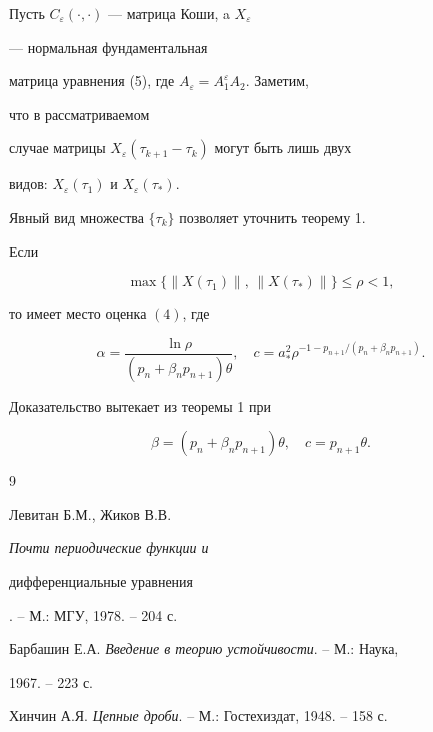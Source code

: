  


Пусть $C_\varepsilon(\cdot,\cdot)$ --- матрица Коши, a $X_\varepsilon$ 


--- нормальная фундаментальная 


матрица уравнения (5), где $A_\varepsilon=A^\varepsilon_1A_2$. Заметим, 


что в рассматриваемом 


случае матрицы $X_\varepsilon(\tau_{k+1}-\tau_k)$ могут быть лишь двух 


видов: $X_\varepsilon(\tau_1)$ и $X_\varepsilon(\tau_*)$. 


Явный вид множества $\{\tau_k\}$ позволяет уточнить теорему 1. 


 


\begin{thm} 


Если 


$$ 


\max\{\|X(\tau_1)\|,\,\|X(\tau_*)\|\}\le\rho<1, 


$$ 


то имеет место оценка $(4)$, где 


$$ 


\alpha=\frac{\ln\rho}{(p_n+\beta_n p_{n+1})\theta},\quad 


c=a^2_*\rho^{-1-p_{n+1}/(p_n+\beta_n p_{n+1})}. 


$$ 


\end{thm} 


 


Доказательство вытекает из теоремы 1 при


$$ 


\beta=(p_n+\beta_n p_{n+1})\theta,\quad c=p_{n+1}\theta. 


$$ 


 


\begin{thebibliography}{9} 


 




Левитан Б.М., Жиков В.В. {\em Почти периодические функции и 


дифференциальные уравнения}. -- М.: МГУ, 1978. -- 204 с. 




Барбашин Е.А. {\em Введение в теорию устойчивости}. -- М.: Наука, 


1967. -- 223 с. 




Хинчин А.Я. {\em Цепные дроби}. -- М.: Гостехиздат, 1948. -- 158 с. 


 


\end{thebibliography} 


 


\vskip 2cm 


 






 


\label{end} 


 



